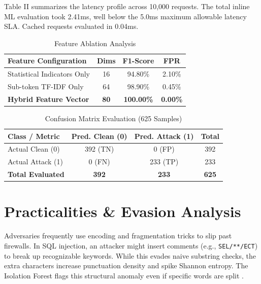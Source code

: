 \documentclass[conference]{IEEEtran}
\begin{document}
Table II summarizes the latency profile across 10,000 requests. The total inline ML evaluation took 2.41ms, well below the 5.0ms maximum allowable latency SLA. Cached requests evaluated in 0.04ms.

\begin{table}[htbp]
\caption{Feature Ablation Analysis}
\begin{center}
\begin{tabular}{lccc}
\toprule
\textbf{Feature Configuration} & \textbf{Dims} & \textbf{F1-Score} & \textbf{FPR} \\
\midrule
Statistical Indicators Only & 16 & 94.80\% & 2.10\% \\
Sub-token TF-IDF Only & 64 & 98.90\% & 0.45\% \\
\textbf{Hybrid Feature Vector} & \textbf{80} & \textbf{100.00\%} & \textbf{0.00\%} \\
\bottomrule
\end{tabular}
\end{center}
\end{table}

\begin{table}[htbp]
\caption{Confusion Matrix Evaluation (625 Samples)}
\begin{center}
\begin{tabular}{lccc}
\toprule
\textbf{Class / Metric} & \textbf{Pred. Clean (0)} & \textbf{Pred. Attack (1)} & \textbf{Total} \\
\midrule
Actual Clean (0) & 392 (TN) & 0 (FP) & 392 \\
Actual Attack (1) & 0 (FN) & 233 (TP) & 233 \\
\textbf{Total Evaluated} & \textbf{392} & \textbf{233} & \textbf{625} \\
\bottomrule
\end{tabular}
\end{center}
\end{table}

\section{Practicalities \& Evasion Analysis}
Adversaries frequently use encoding and fragmentation tricks to slip past firewalls. In SQL injection, an attacker might insert comments (e.g., \texttt{SEL/**/ECT}) to break up recognizable keywords. While this evades naive substring checks, the extra characters increase punctuation density and spike Shannon entropy. The Isolation Forest flags this structural anomaly even if specific words are split \cite{corona2021}.
\end{document}
